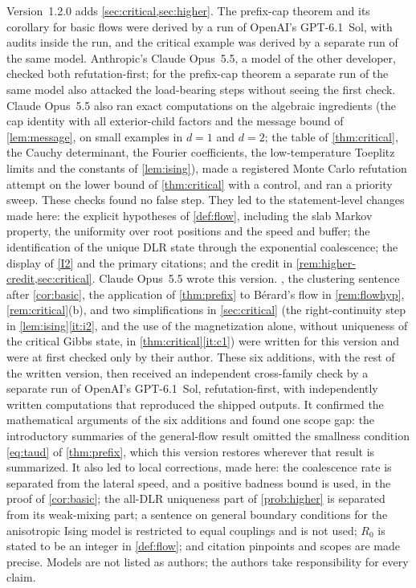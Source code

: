 \documentclass[11pt]{article}
\theoremstyle{plain}
\theoremstyle{definition}
\theoremstyle{remark}
\begin{document}
Version~1.2.0 adds \cref{sec:critical,sec:higher}. The prefix-cap theorem and its corollary for basic flows were derived by a run of OpenAI's GPT-6.1~Sol, with audits inside the run, and the critical example was derived by a separate run of the same model. Anthropic's Claude Opus~5.5, a model of the other developer, checked both refutation-first; for the prefix-cap theorem a separate run of the same model also attacked the load-bearing steps without seeing the first check. Claude Opus~5.5 also ran exact computations on the algebraic ingredients (the cap identity with all exterior-child factors and the message bound of \cref{lem:message}, on small examples in $d=1$ and $d=2$; the table of \cref{thm:critical}, the Cauchy determinant, the Fourier coefficients, the low-temperature Toeplitz limits and the constants of \cref{lem:ising}), made a registered Monte Carlo refutation attempt on the lower bound of \cref{thm:critical} with a control, and ran a priority sweep. These checks found no false step. They led to the statement-level changes made here: the explicit hypotheses of \cref{def:flow}, including the slab Markov property, the uniformity over root positions and the speed and buffer; the identification of the unique DLR state through the exponential coalescence; the display of \ref{I2} and the primary citations; and the credit in \cref{rem:higher-credit,sec:critical}. Claude Opus~5.5 wrote this version. , the clustering sentence after \cref{cor:basic}, the application of \cref{thm:prefix} to B\'erard's flow in \cref{rem:flowhyp}, \cref{rem:critical}(b), and two simplifications in \cref{sec:critical} (the right-continuity step in \cref{lem:ising}\ref{it:i2}, and the use of the magnetization alone, without uniqueness of the critical Gibbs state, in \cref{thm:critical}\ref{it:c1}) were written for this version and were at first checked only by their author. These six additions, with the rest of the written version, then received an independent cross-family check by a separate run of OpenAI's GPT-6.1~Sol, refutation-first, with independently written computations that reproduced the shipped outputs. It confirmed the mathematical arguments of the six additions and found one scope gap: the introductory summaries of the general-flow result omitted the smallness condition \eqref{eq:taud} of \cref{thm:prefix}, which this version restores wherever that result is summarized. It also led to local corrections, made here: the coalescence rate is separated from the lateral speed, and a positive badness bound is used, in the proof of \cref{cor:basic}; the all-DLR uniqueness part of \cref{prob:higher} is separated from its weak-mixing part; a sentence on general boundary conditions for the anisotropic Ising model is restricted to equal couplings and is not used; $R_0$ is stated to be an integer in \cref{def:flow}; and citation pinpoints and scopes are made precise. Models are not listed as authors; the authors take responsibility for every claim.
\end{document}
